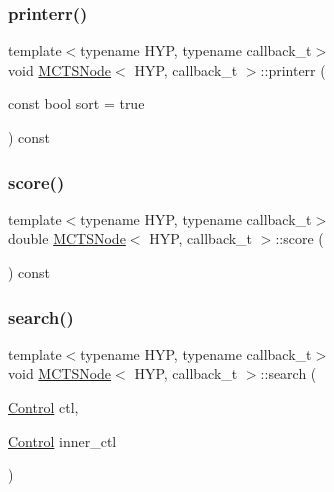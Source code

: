 \mbox{\label{class_m_c_t_s_node_aabe3f97545bc6e46220fef78537882ec}} 
\subsubsection{\texorpdfstring{printerr()}{printerr()}}
{\footnotesize\ttfamily template$<$typename H\+YP, typename callback\+\_\+t$>$ \\
void \hyperlink{class_m_c_t_s_node}{M\+C\+T\+S\+Node}$<$ H\+YP, callback\+\_\+t $>$\+::printerr (\begin{DoxyParamCaption}\item[{const bool}]{sort = {\ttfamily true} }\end{DoxyParamCaption}) const\hspace{0.3cm}{\ttfamily [inline]}}

\mbox{\label{class_m_c_t_s_node_acd7b0a82ce6fce44bff99a844ccfee32}} 
\subsubsection{\texorpdfstring{score()}{score()}}
{\footnotesize\ttfamily template$<$typename H\+YP, typename callback\+\_\+t$>$ \\
double \hyperlink{class_m_c_t_s_node}{M\+C\+T\+S\+Node}$<$ H\+YP, callback\+\_\+t $>$\+::score (\begin{DoxyParamCaption}{ }\end{DoxyParamCaption}) const\hspace{0.3cm}{\ttfamily [inline]}}

\mbox{\label{class_m_c_t_s_node_ac62bd50472a606d1002f44de2021c77e}} 
\subsubsection{\texorpdfstring{search()}{search()}}
{\footnotesize\ttfamily template$<$typename H\+YP, typename callback\+\_\+t$>$ \\
void \hyperlink{class_m_c_t_s_node}{M\+C\+T\+S\+Node}$<$ H\+YP, callback\+\_\+t $>$\+::search (\begin{DoxyParamCaption}\item[{\hyperlink{struct_control}{Control}}]{ctl,  }\item[{\hyperlink{struct_control}{Control}}]{inner\+\_\+ctl }\end{DoxyParamCaption})\hspace{0.3cm}{\ttfamily [inline]}}

